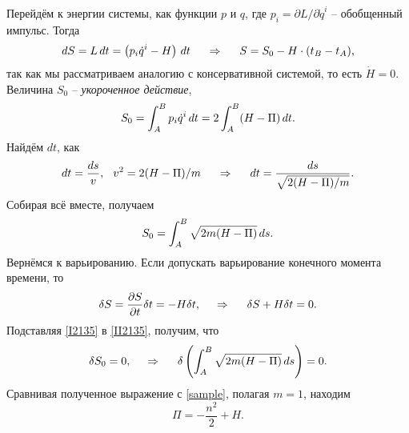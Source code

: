 Перейдём к энергии системы, как функции $p$ и $q$, где $p_i = \partial L / \partial \dot{q}^i$ -- обобщенный импульс. Тогда
\begin{equation}
\label{I2135}
    dS = L \, d t = \left(p_i  \dot{q}^i - H\right) \, d t
    \hspace{0.5cm} \Rightarrow \hspace{0.5cm} 
    S  = S_0 - H \cdot(t_B-t_A), 
\end{equation}
так как мы рассматриваем аналогию с консервативной системой, то есть $\dot{H} = 0$. Величина $S_0$ -- \textit{укороченное действие},
\begin{equation*}
    S_0 = \int_A^B p_i \dot{q}^i \, d t = 
    2 \int_A^B (H - \Pi) \, d t.
\end{equation*}
Найдём $dt$, как
\begin{equation*}
    dt = \frac{ds}{v},
    \hspace{0.25cm} 
    v^2 = 2 (H-\Pi) / m
    \hspace{0.5cm} \Rightarrow \hspace{0.5cm} 
    dt = \frac{ds}{
    \sqrt{2(H-\Pi) / m}}.
\end{equation*}
Собирая всё вместе, получаем
\begin{equation*}
    S_0 = \int_A^B\sqrt{2m(H-\Pi)} \, d s.
\end{equation*}
Вернёмся к варьированию. Если допускать варьирование конечного момента времени, то
\begin{equation}
\label{II2135}
    \delta S = \frac{\partial S}{\partial t}  \delta t = -H \delta t, \hspace{0.5cm} \Rightarrow \hspace{0.5cm} 
    \delta S + H \delta t = 0.
\end{equation}
Подставляя \eqref{I2135} в \eqref{II2135}, получим, что
\begin{equation}
    \delta S_0 = 0, 
    \hspace{0.5cm} \Rightarrow \hspace{0.5cm} 
    \delta \left(
        \int_A^B\sqrt{2m(H-\Pi)} \, d s
    \right) = 0.
\end{equation}
Сравнивая полученное выражение с \eqref{sample}, полагая $m =1$, находим
\begin{equation}
    \Pi = -\frac{n^2}{2} + H.
\end{equation}

